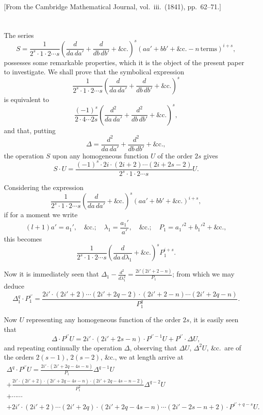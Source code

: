 \documentclass[11pt,a4paper]{book}
\theoremstyle{plain}
\theoremstyle{definition}
\theoremstyle{remark}
\begin{document}
\begin{center}
\small[From the Cambridge Mathematical Journal, vol.~iii.\ (1841), pp.~62--71.]
\end{center}

\section*{}

The series
\[
S = \frac{1}{2^s \cdot 1 \cdot 2 \cdots s} \left(\frac{d}{da\, da'} + \frac{d}{db\, db'} + \&\mathrm{c.}\right)^s
(aa' + bb' + \&\mathrm{c.} - n\,\mathrm{terms})^{i+s},
\]
possesses some remarkable properties, which it is the object of the present paper to investigate. We shall prove that the symbolical expression
\[
\frac{1}{2^s \cdot 1 \cdot 2 \cdots s} \left(\frac{d}{da\, da'} + \frac{d}{db\, db'} + \&\mathrm{c.}\right)^s
\]
is equivalent to
\[
\frac{(-1)^s}{2 \cdot 4 \cdots 2s} \left(\frac{d^2}{da\, da'} + \frac{d^2}{db\, db'} + \&\mathrm{c.}\right)^s,
\]
and that, putting
\[
\Delta = \frac{d^2}{da\, da'} + \frac{d^2}{db\, db'} + \&\mathrm{c.},
\]
the operation $S$ upon any homogeneous function $U$ of the order $2s$ gives
\[
S \cdot U = \frac{(-1)^s \cdot 2i \cdot (2i+2) \cdots (2i+2s-2)}{2^s \cdot 1 \cdot 2 \cdots s} U.
\]

Considering the expression
\[
\frac{1}{2^s \cdot 1 \cdot 2 \cdots s} \left(\frac{d}{da\, da'} + \&\mathrm{c.}\right)^s (aa' + bb' + \&\mathrm{c.})^{i+s},
\]
if for a moment we write
\[
(l+1)a' = a_1', \quad \&\mathrm{c.}; \quad \lambda_1 = \frac{a_1'}{a'}, \quad \&\mathrm{c.};
\quad P_1 = a_1'^2 + b_1'^2 + \&\mathrm{c.},
\]
this becomes
\[
\frac{1}{2^s \cdot 1 \cdot 2 \cdots s} \left(\frac{d}{da\, d\lambda_1} + \&\mathrm{c.}\right)^s P_1^{i+s}.
\]

Now it is immediately seen that $\Delta_1 - \frac{d^2}{d\lambda_1^2} = \frac{2i'(2i'+2-n)}{P_1}$; from which we may deduce
\[
\Delta_1^q \cdot P_1^{i'} = \frac{2i' \cdot (2i'+2) \cdots (2i'+2q-2) \cdot (2i'+2-n) \cdots (2i'+2q-n)}{P_1^q}.
\]

Now $U$ representing any homogeneous function of the order $2s$, it is easily seen that
\[
\Delta \cdot P^{i'} U = 2i' \cdot (2i'+2s-n) \cdot P^{i'-1} U + P^{i'} \cdot \Delta U,
\]
and repeating continually the operation $\Delta$, observing that $\Delta U$, $\Delta^2 U$, \&c.\ are of the orders $2(s-1)$, $2(s-2)$, \&c., we at length arrive at
\begin{multline*}
\Delta^q \cdot P^{i'} U = \frac{2i' \cdot (2i'+2q-4s-n)}{P_1} \Delta^{q-1} U \\
+ \frac{2i' \cdot (2i'+2) \cdot (2i'+2q-4s-n) \cdot (2i'+2q-4s-n-2)}{P_1^2} \Delta^{q-2} U \\
+ \cdots \cdots \\
+ 2i' \cdot (2i'+2) \cdots (2i'+2q) \cdot (2i'+2q-4s-n) \cdots (2i'-2s-n+2) \cdot P^{i'+q-s} U.
\end{multline*}
\end{document}
